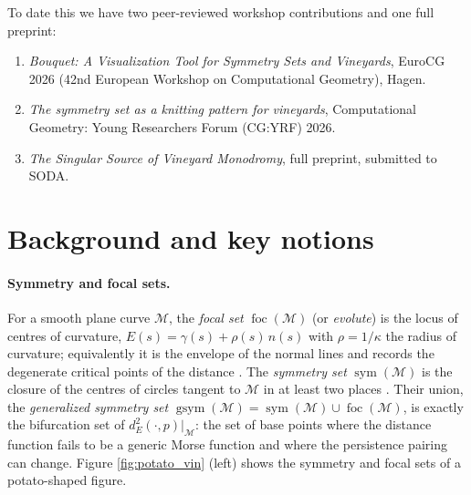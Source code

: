 \documentclass[10pt]{article}
\newcommand{\M}{\mathcal{M}}
\newcommand{\gsym}{\operatorname{gsym}}
\newcommand{\sym}{\operatorname{sym}}
\newcommand{\foc}{\operatorname{foc}}
\newcommand{\dist}{d_E}
\begin{document}
To date this we have two peer-reviewed workshop contributions and one full preprint:
\begin{enumerate}[label=(\textbf{P\arabic*})]
  \item \emph{Bouquet: A Visualization Tool for Symmetry Sets and Vineyards},
        EuroCG 2026 (42nd European Workshop on Computational Geometry), Hagen.
  \item \emph{The symmetry set as a knitting pattern for vineyards},
        Computational Geometry: Young Researchers Forum (CG:YRF) 2026.
  \item \emph{The Singular Source of Vineyard Monodromy}, full preprint,
        submitted to SODA.
\end{enumerate}

\section{Background and key notions}
\paragraph{Symmetry and focal sets.}
For a smooth plane curve $\M$, the \emph{focal set}  $\foc(\M)$ (or \emph{evolute}) is the locus of centres of curvature, $E(s)=\gamma(s)+\rho(s)\,n(s)$ with $\rho=1/\kappa$ the radius of curvature; equivalently it is the envelope of the normal lines and records the degenerate critical points of the distance \cite{porteous2001geometric}. The \emph{symmetry set} $\sym(\M)$ is the closure of the centres of circles tangent to $\M$ in at least two places \cite{bruce1985symmetry}. Their union, the \emph{generalized symmetry set} $\gsym(\M)=\sym(\M)\cup\foc(\M)$, is exactly the bifurcation set of $\dist^2(\cdot,p)|_\M$: the set of base points where the distance function fails to be a generic Morse function and where the persistence pairing can change. Figure \ref{fig:potato_vin} (left) shows the symmetry and focal sets of a potato-shaped figure.
\end{document}
